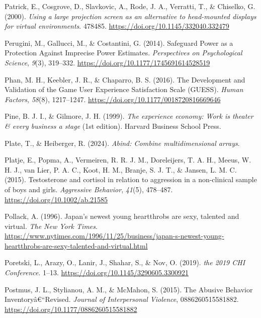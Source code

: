 \documentclass[
]{udthesis}
\newlength{\cslhangindent}
\newenvironment{CSLReferences}[2] %
 {\begin{list}{}{%
  \setlength{\itemindent}{0pt}
  \setlength{\leftmargin}{0pt}
  \setlength{\parsep}{0pt}
  \ifodd #1
   \setlength{\leftmargin}{\cslhangindent}
   \setlength{\itemindent}{-1\cslhangindent}
  \fi
  \setlength{\itemsep}{#2\baselineskip}}}
 {\end{list}}
\begin{document}
\begin{CSLReferences}{1}{0}
Patrick, E., Cosgrove, D., Slavkovic, A., Rode, J. A., Verratti, T., \& Chiselko, G. (2000). \emph{Using a large projection screen as an alternative to head-mounted displays for virtual environments}. 478485. \url{https://doi.org/10.1145/332040.332479}

Perugini, M., Gallucci, M., \& Costantini, G. (2014). Safeguard {Power} as a {Protection Against Imprecise Power Estimates}. \emph{Perspectives on Psychological Science}, \emph{9}(3), 319--332. \url{https://doi.org/10.1177/1745691614528519}

Phan, M. H., Keebler, J. R., \& Chaparro, B. S. (2016). The {Development} and {Validation} of the {Game User Experience Satisfaction Scale} ({GUESS}). \emph{Human Factors}, \emph{58}(8), 1217--1247. \url{https://doi.org/10.1177/0018720816669646}

Pine, B. J. I., \& Gilmore, J. H. (1999). \emph{The experience economy: Work is theater \& every business a stage} (1st edition). Harvard Business School Press.

Plate, T., \& Heiberger, R. (2024). \emph{Abind: Combine multidimensional arrays}.

Platje, E., Popma, A., Vermeiren, R. R. J. M., Doreleijers, T. A. H., Meeus, W. H. J., van Lier, P. A. C., Koot, H. M., Branje, S. J. T., \& Jansen, L. M. C. (2015). Testosterone and cortisol in relation to aggression in a non-clinical sample of boys and girls. \emph{Aggressive Behavior}, \emph{41}(5), 478--487. \url{https://doi.org/10.1002/ab.21585}

Pollack, A. (1996). Japan's newest young heartthrobs are sexy, talented and virtual. \emph{The New York Times}. \url{https://www.nytimes.com/1996/11/25/business/japan-s-newest-young-heartthrobs-are-sexy-talented-and-virtual.html}

Poretski, L., Arazy, O., Lanir, J., Shahar, S., \& Nov, O. (2019). \emph{the 2019 CHI Conference}. 1--13. \url{https://doi.org/10.1145/3290605.3300921}

Postmus, J. L., Stylianou, A. M., \& McMahon, S. (2015). The {Abusive Behavior Inventory}â€``{Revised}. \emph{Journal of Interpersonal Violence}, 0886260515581882. \url{https://doi.org/10.1177/0886260515581882}


\end{CSLReferences}
\end{document}
